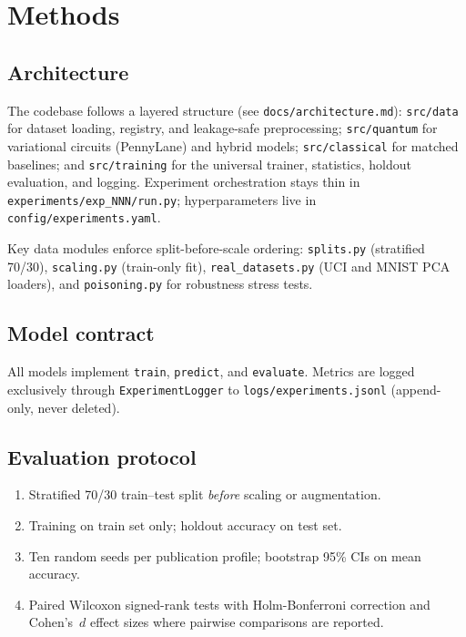 \section{Methods}
\label{sec:methods}

\subsection{Architecture}

The codebase follows a layered structure (see \texttt{docs/architecture.md}):
\texttt{src/data} for dataset loading, registry, and leakage-safe preprocessing;
\texttt{src/quantum} for variational circuits (PennyLane) and hybrid models;
\texttt{src/classical} for matched baselines; and
\texttt{src/training} for the universal trainer, statistics, holdout evaluation, and logging.
Experiment orchestration stays thin in \texttt{experiments/exp\_NNN/run.py};
hyperparameters live in \texttt{config/experiments.yaml}.

Key data modules enforce split-before-scale ordering:
\texttt{splits.py} (stratified 70/30), \texttt{scaling.py} (train-only fit),
\texttt{real\_datasets.py} (UCI and MNIST PCA loaders), and \texttt{poisoning.py}
for robustness stress tests.

\subsection{Model contract}

All models implement \texttt{train}, \texttt{predict}, and \texttt{evaluate}.
Metrics are logged exclusively through \texttt{ExperimentLogger} to
\texttt{logs/experiments.jsonl} (append-only, never deleted).

\subsection{Evaluation protocol}

\begin{enumerate}
  \item Stratified 70/30 train--test split \emph{before} scaling or augmentation.
  \item Training on train set only; holdout accuracy on test set.
  \item Ten random seeds per publication profile; bootstrap 95\% CIs on mean accuracy.
  \item Paired Wilcoxon signed-rank tests with Holm-Bonferroni correction and Cohen's~$d$
        effect sizes where pairwise comparisons are reported.
\end{enumerate}

